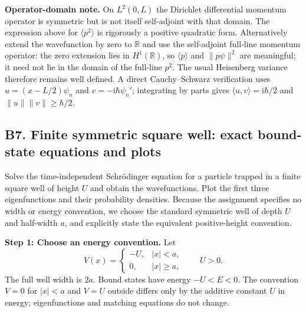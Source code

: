 \documentclass[11pt,a4paper]{article}
\newcommand{\iu}{\mathrm{i}}
\newcommand{\R}{\mathbb R}
\newcommand{\Sch}{Schr\"odinger}
\newcommand{\abs}[1]{\left|#1\right|}
\begin{document}
\textbf{Operator-domain note.} On $L^2(0,L)$ the Dirichlet differential momentum operator is symmetric but is not itself self-adjoint with that domain. The expression above for $\langle p^2\rangle$ is rigorously a positive quadratic form. Alternatively extend the wavefunction by zero to $\R$ and use the self-adjoint full-line momentum operator: the zero extension lies in $H^1(\R)$, so $\langle p\rangle$ and $\|p\psi\|^2$ are meaningful; it need not lie in the domain of the full-line $p^2$. The usual Heisenberg variance therefore remains well defined. A direct Cauchy--Schwarz verification uses $u=(x-L/2)\psi_n$ and $v=-\iu\hbar\psi_n'$; integrating by parts gives $\langle u,v\rangle=\iu\hbar/2$ and $\|u\|\|v\|\geq\hbar/2$.

\subsection{B7. Finite symmetric square well: exact bound-state equations and plots}
\begin{questionbox}
Solve the time-independent \Sch{} equation for a particle trapped in a finite square well of height $U$ and obtain the wavefunctions. Plot the first three eigenfunctions and their probability densities. Because the assignment specifies no width or energy convention, we choose the standard symmetric well of depth $U$ and half-width $a$, and explicitly state the equivalent positive-height convention.
\end{questionbox}
\textbf{Step 1: Choose an energy convention.} Let
\begin{equation}\label{eq:Vfinite}
\boxed{V(x)=\begin{cases}-U,&\abs x<a,\\0,&\abs x\geq a,\end{cases}\qquad U>0.}
\end{equation}
The full well width is $2a$. Bound states have energy $-U<E<0$. The convention $V=0$ for $\abs x<a$ and $V=U$ outside differs only by the additive constant $U$ in energy; eigenfunctions and matching equations do not change.
\end{document}

